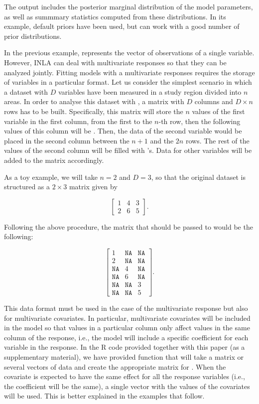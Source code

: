 \medskip
The output includes the posterior marginal distribution of the model parameters, as well as summmary statistics computed from these distributions. In its example, default priors have been used, but  can work with a good number of prior distributions.

\medskip
In the previous example,  represents the vector of observations of a single variable. However, INLA can deal with multivariate responses so that they can be analyzed jointly. Fitting models with a multivariate responses requires the storage of variables in a particular format. Let us consider the simplest scenario in which 
a dataset with $D$ variables have been measured in a study region divided into $n$ areas. In order to analyse this dataset with , a matrix with $D$ columns and $D \times n$ rows has to be built. Specifically, this matrix will store the $n$ values of the first variable in the first column, from the first to the $n$-th row, then the following values of this column will be .
Then, the data of the second variable would be placed in the second column between the $n+1$ and the $2n$ rows. The rest of the values of the second column will be filled with 's. Data for other variables will be added to the matrix accordingly.

\medskip
As a toy example, we will take $n=2$ and $D=3$, so that the original dataset is structured as a $2\times 3$ matrix given by


$$
\begin{bmatrix}
1 & 4 & 3 \\
2 & 6 & 5 
\end{bmatrix} .
$$



Following the above procedure, the matrix that should be passed to  would be the following:


$$
\begin{bmatrix}
1  & \texttt{NA} & \texttt{NA} \\
2  & \texttt{NA} & \texttt{NA} \\
\texttt{NA} & 4  & \texttt{NA} \\
\texttt{NA} & 6  & \texttt{NA} \\
\texttt{NA} & \texttt{NA} & 3 \\
\texttt{NA} & \texttt{NA} & 5 
\end{bmatrix} .
$$


\medskip
This data format must be used in the case of the multivariate response but also for multivariate covariates. In particular, multivariate covariates will be included in the model so that values in a particular column only affect values in the same column of the response, i.e., the model will include a specific coefficient for each variable in the response. In the R code provided together with this paper (as a supplementary material), we have provided function  that will take a matrix or several vectors of data and create the appropriate matrix for . When the covariate is expected to have the same effect for all the response variables (i.e., the coefficient will be the same), a single vector with the values of the covariates will be used. This is better explained in the examples that follow.


